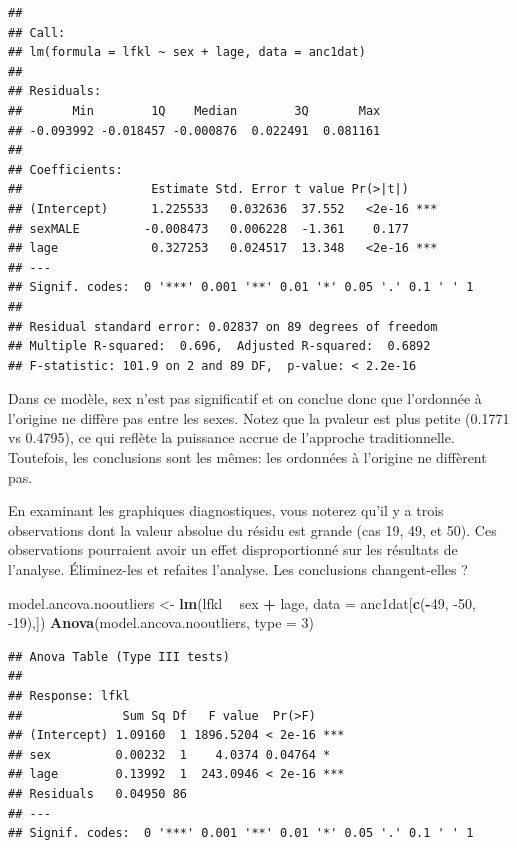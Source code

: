 \documentclass[12pt,]{book}
\makeatletter
\newenvironment{Shaded}{\begin{snugshade}}{\end{snugshade}}
\newcommand{\DataTypeTok}[1]{\textcolor[rgb]{0.13,0.29,0.53}{#1}}
\newcommand{\DecValTok}[1]{\textcolor[rgb]{0.00,0.00,0.81}{#1}}
\newcommand{\KeywordTok}[1]{\textcolor[rgb]{0.13,0.29,0.53}{\textbf{#1}}}
\newcommand{\NormalTok}[1]{#1}
\newcommand{\OperatorTok}[1]{\textcolor[rgb]{0.81,0.36,0.00}{\textbf{#1}}}
\newcommand{\StringTok}[1]{\textcolor[rgb]{0.31,0.60,0.02}{#1}}
\newenvironment{kframe}{%
\medskip{}
\setlength{\fboxsep}{.8em}
\def\at@end@of@kframe{}%
\ifinner\ifhmode%
 \def\at@end@of@kframe{\end{minipage}}%
 \begin{minipage}{\columnwidth}%
\fi\fi%
\def\FrameCommand##1{\hskip\@totalleftmargin \hskip-\fboxsep
\colorbox{incolor}{##1}\hskip-\fboxsep
    \hskip-\linewidth \hskip-\@totalleftmargin \hskip\columnwidth}%
\MakeFramed {\advance\hsize-\width
  \@totalleftmargin\z@ \linewidth\hsize
  \@setminipage}}%
{\par\unskip\endMakeFramed%
\at@end@of@kframe}
\newenvironment{rmdblock}[1]
 {
 \begin{itemize}
 \renewcommand{\labelitemi}{
   \raisebox{-.7\height}[0pt][0pt]{
     {\setkeys{Gin}{width=3em,keepaspectratio}\texttt{[image: images/\#1]}}
   }
 }
 \begin{kframe}
 \setlength{\fboxsep}{1em}
 \item
 }
 {
 \end{kframe}
 \end{itemize}
 }
\newenvironment{rmdcode}
  {\begin{rmdblock}{screen}}
  {\end{rmdblock}}
\makeatother
\begin{document}
\begin{verbatim}
## 
## Call:
## lm(formula = lfkl ~ sex + lage, data = anc1dat)
## 
## Residuals:
##       Min        1Q    Median        3Q       Max 
## -0.093992 -0.018457 -0.000876  0.022491  0.081161 
## 
## Coefficients:
##                  Estimate Std. Error t value Pr(>|t|)    
## (Intercept)      1.225533   0.032636  37.552   <2e-16 ***
## sexMALE         -0.008473   0.006228  -1.361    0.177    
## lage             0.327253   0.024517  13.348   <2e-16 ***
## ---
## Signif. codes:  0 '***' 0.001 '**' 0.01 '*' 0.05 '.' 0.1 ' ' 1
## 
## Residual standard error: 0.02837 on 89 degrees of freedom
## Multiple R-squared:  0.696,  Adjusted R-squared:  0.6892 
## F-statistic: 101.9 on 2 and 89 DF,  p-value: < 2.2e-16
\end{verbatim}

Dans ce modèle, sex n'est pas significatif et on conclue donc que l'ordonnée à l'origine ne diffère pas entre les sexes. Notez que la pvaleur est plus petite (0.1771 vs 0.4795), ce qui reflète la puissance accrue de l'approche traditionnelle. Toutefois, les conclusions sont les mêmes: les ordonnées à l'origine ne diffèrent pas.

\begin{rmdcode}
En examinant les graphiques diagnostiques, vous noterez qu'il y a trois observations dont la valeur absolue du résidu est grande (cas 19, 49, et 50). Ces observations pourraient avoir un effet disproportionné sur les résultats de l'analyse. Éliminez-les et refaites l'analyse. Les conclusions changent-elles ?
\end{rmdcode}

\begin{Shaded}
\begin{Highlighting}[]
\NormalTok{model.ancova.nooutliers <-}\StringTok{ }\KeywordTok{lm}\NormalTok{(lfkl }\OperatorTok{~}\StringTok{ }\NormalTok{sex }\OperatorTok{+}\StringTok{ }\NormalTok{lage, }\DataTypeTok{data =}\NormalTok{ anc1dat[}\KeywordTok{c}\NormalTok{(}\OperatorTok{-}\DecValTok{49}\NormalTok{, }\DecValTok{-50}\NormalTok{, }\DecValTok{-19}\NormalTok{),])}
\KeywordTok{Anova}\NormalTok{(model.ancova.nooutliers, }\DataTypeTok{type =} \DecValTok{3}\NormalTok{)}
\end{Highlighting}
\end{Shaded}

\begin{verbatim}
## Anova Table (Type III tests)
## 
## Response: lfkl
##              Sum Sq Df   F value  Pr(>F)    
## (Intercept) 1.09160  1 1896.5204 < 2e-16 ***
## sex         0.00232  1    4.0374 0.04764 *  
## lage        0.13992  1  243.0946 < 2e-16 ***
## Residuals   0.04950 86                      
## ---
## Signif. codes:  0 '***' 0.001 '**' 0.01 '*' 0.05 '.' 0.1 ' ' 1
\end{verbatim}
\end{document}
